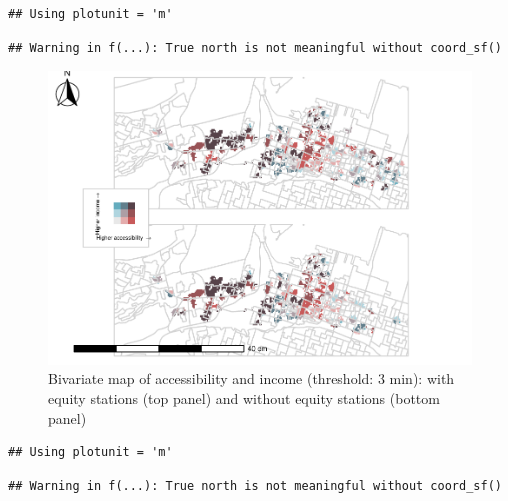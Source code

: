 \documentclass[]{elsarticle} %
\begin{document}
\begin{verbatim}
## Using plotunit = 'm'
\end{verbatim}

\begin{verbatim}
## Warning in f(...): True north is not meaningful without coord_sf()
\end{verbatim}

\begin{figure}
\includegraphics[width=1\linewidth]{Bike-share-spatial-equity_files/figure-latex/figure-bi-map-threshold-3-1} \caption{\label{fig-bivariate-map-threshold-3}Bivariate map of accessibility and income (threshold: 3 min): with equity stations (top panel) and without equity stations (bottom panel)}\label{fig:figure-bi-map-threshold-3}
\end{figure}

\begin{verbatim}
## Using plotunit = 'm'
\end{verbatim}

\begin{verbatim}
## Warning in f(...): True north is not meaningful without coord_sf()
\end{verbatim}
\end{document}
